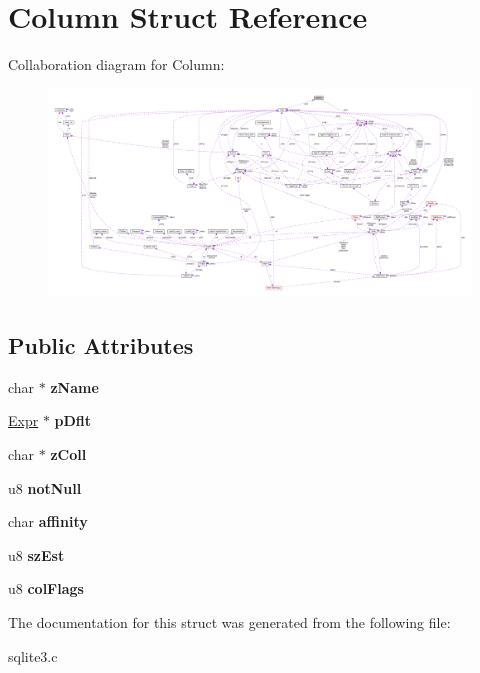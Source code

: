 \hypertarget{structColumn}{}\section{Column Struct Reference}
\label{structColumn}


Collaboration diagram for Column\+:\nopagebreak
\begin{figure}[H]
\begin{center}
\leavevmode
\includegraphics[width=350pt]{structColumn__coll__graph}
\end{center}
\end{figure}
\subsection*{Public Attributes}
\begin{DoxyCompactItemize}
\item 
char $\ast$ {\bfseries z\+Name}\hypertarget{structColumn_a6450a4e9fde68b3a2d79425d826eccc3}{}\label{structColumn_a6450a4e9fde68b3a2d79425d826eccc3}

\item 
\hyperlink{structExpr}{Expr} $\ast$ {\bfseries p\+Dflt}\hypertarget{structColumn_ac4178f302df70048235660979f84ffe4}{}\label{structColumn_ac4178f302df70048235660979f84ffe4}

\item 
char $\ast$ {\bfseries z\+Coll}\hypertarget{structColumn_aa95909d5c77b321258622ed28d7b96eb}{}\label{structColumn_aa95909d5c77b321258622ed28d7b96eb}

\item 
u8 {\bfseries not\+Null}\hypertarget{structColumn_a852e9a4c1c327a64d9b051dcafda3841}{}\label{structColumn_a852e9a4c1c327a64d9b051dcafda3841}

\item 
char {\bfseries affinity}\hypertarget{structColumn_ac9d6fe31c45888cecaf3f5ad5b93bf23}{}\label{structColumn_ac9d6fe31c45888cecaf3f5ad5b93bf23}

\item 
u8 {\bfseries sz\+Est}\hypertarget{structColumn_a6d28f0023e550ea38ad2ab544942114d}{}\label{structColumn_a6d28f0023e550ea38ad2ab544942114d}

\item 
u8 {\bfseries col\+Flags}\hypertarget{structColumn_aadfed8f7a238c314e1499a6c4090f920}{}\label{structColumn_aadfed8f7a238c314e1499a6c4090f920}

\end{DoxyCompactItemize}


The documentation for this struct was generated from the following file\+:\begin{DoxyCompactItemize}
\item 
sqlite3.\+c\end{DoxyCompactItemize}

